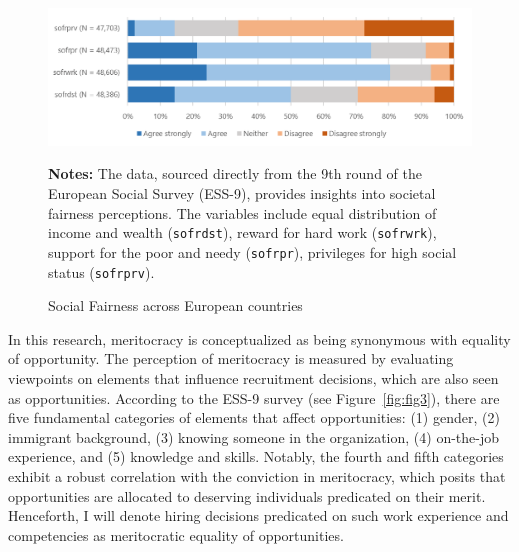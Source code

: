 \begin{figure}[h!]
	\centering
	\includegraphics[width=0.9\linewidth]{figs/fig2}
	\caption{Social Fairness across European countries}
	\label{fig:fig2}
	\begin{minipage}{1\linewidth}
		\vspace{0.2cm}
		\footnotesize
		\textbf{Notes:}	The data, sourced directly from the 9th round of the European Social Survey (ESS-9), provides insights into societal fairness perceptions. The variables include equal distribution of income and wealth (\texttt{sofrdst}), reward for hard work (\texttt{sofrwrk}), support for the poor and needy (\texttt{sofrpr}), privileges for high social status (\texttt{sofrprv}).	
	\end{minipage}
\end{figure}


In this research, meritocracy is conceptualized as being synonymous with equality of opportunity. The perception of meritocracy is measured by evaluating viewpoints on elements that influence recruitment decisions, which are also seen as opportunities. According to the ESS-9 survey (see Figure~\ref{fig:fig3}), there are five fundamental categories of elements that affect opportunities: (1) gender, (2) immigrant background, (3) knowing someone in the organization, (4) on-the-job experience, and (5) knowledge and skills. Notably, the fourth and fifth categories exhibit a robust correlation with the conviction in meritocracy, which posits that opportunities are allocated to deserving individuals predicated on their merit. Henceforth, I will denote hiring decisions predicated on such work experience and competencies as meritocratic equality of opportunities.

